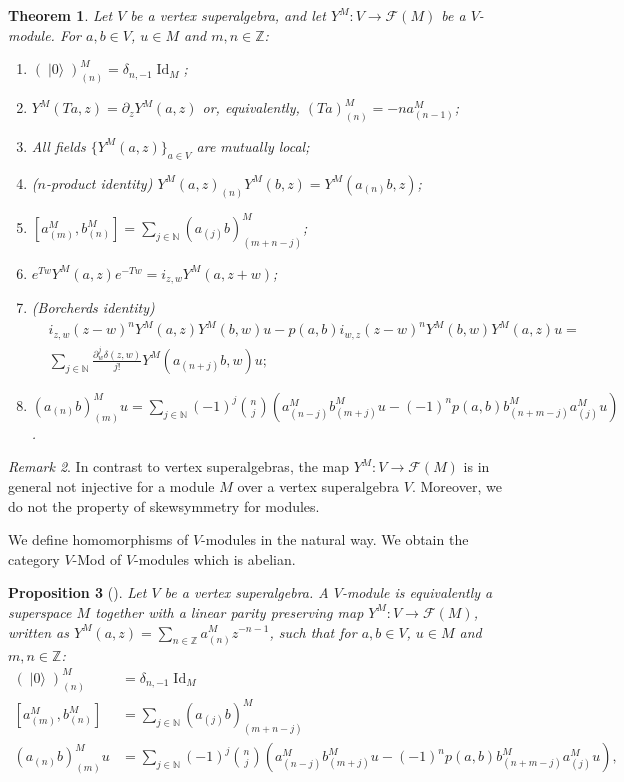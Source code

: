 \documentclass[a4paper, 12pt, reqno]{amsart}
\newtheorem{theorem}{Theorem}[section]
\newtheorem{proposition}[theorem]{Proposition}
\theoremstyle{remark}
\newtheorem{remark}[theorem]{Remark}
\numberwithin{equation}{subsection}
\DeclareMathOperator{\Id}{Id}
\DeclareMathOperator{\vac}{|0\rangle}
\begin{document}
\begin{theorem}
  \label{thr:24}
  Let $V$ be a vertex superalgebra, and let $Y^M: V \to \mathcal{F}(M)$ be a $V$-module.
  For $a, b \in V$, $u \in M$ and $m, n \in \mathbb{Z}$:
  \begin{enumerate}
  \item $(\vac)^M_{(n)} = \delta_{n, -1}\Id_M$;
  \item $Y^M(Ta, z) = \partial_zY^M(a, z)$ or, equivalently, $(Ta)^M_{(n)} = -na^M_{(n - 1)}$;
  \item All fields $\{Y^M(a, z)\}_{a \in V}$ are mutually local;
  \item \emph{($n$-product identity)} $Y^M(a, z)_{(n)}Y^M(b, z) = Y^M(a_{(n)}b, z)$;
  \item $[a^M_{(m)}, b^M_{(n)}] = \sum_{j \in \mathbb{N}}(a_{(j)}b)^M_{(m + n - j)}$;
  \item $e^{Tw}Y^M(a, z)e^{-Tw} = i_{z, w}Y^M(a, z + w)$;
  \item \emph{(Borcherds identity)}
    \begin{equation*}
      \begin{split}
        &i_{z, w}(z - w)^nY^M(a, z)Y^M(b, w)u - p(a, b)i_{w, z}(z - w)^nY^M(b, w)Y^M(a, z)u = \\
        &\sum_{j \in \mathbb{N}}\frac{\partial^j_w\delta(z, w)}{j!}Y^M(a_{(n + j)}b, w)u;
      \end{split}
    \end{equation*}
  \item $(a_{(n)}b)^M_{(m)}u = \sum_{j \in \mathbb{N}}(-1)^j\binom{n}{j}(a^M_{(n - j)}b^M_{(m + j)}u - (-1)^np(a, b)b^M_{(n + m - j)}a^M_{(j)}u)$.
  \end{enumerate}
\end{theorem}

\begin{remark}
  \label{rmk:21}
  In contrast to vertex superalgebras, the map $Y^M: V \to \mathcal{F}(M)$ is in general not injective for a module $M$ over a vertex superalgebra $V$.
  Moreover, we do not the property of skewsymmetry for modules.
\end{remark}

We define homomorphisms of $V$-modules in the natural way.
We obtain the category $V$-Mod of $V$-modules which is abelian.

\begin{proposition}[{\cite[\S3]{dong_twisted_1998}}]
  \label{prp:9}
  Let $V$ be a vertex superalgebra.
  A $V$-module is equivalently a superspace $M$ together with a linear parity preserving map $Y^M: V \to \mathcal{F}(M)$, written as $Y^M(a, z) = \sum_{n \in \mathbb{Z}}a^M_{(n)}z^{-n - 1}$, such that for $a, b \in V$, $u \in M$ and $m, n \in \mathbb{Z}$:
  \begin{align}
    \label{eq:21}
    (\vac)^M_{(n)} &= \delta_{n, -1}\Id_M \\
    \label{eq:22}
    [a^M_{(m)}, b^M_{(n)}] &= \sum_{j \in \mathbb{N}}(a_{(j)}b)^M_{(m + n - j)} \\
    \label{eq:23}
    (a_{(n)}b)^M_{(m)}u &= \sum_{j \in \mathbb{N}}(-1)^j\binom{n}{j}(a^M_{(n - j)}b^M_{(m + j)}u - (-1)^np(a, b)b^M_{(n + m - j)}a^M_{(j)}u),
  \end{align}
\end{proposition}
\end{document}
